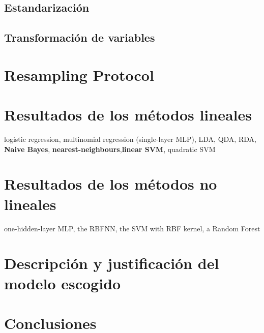 \documentclass[a4paper]{article}
\begin{document}
\subsection{Estandarización}

\subsection{Transformación de variables}

\section{Resampling Protocol}

\section{Resultados de los métodos lineales}
logistic regression, multinomial regression
(single-layer MLP), LDA, QDA, RDA, \textbf{Naive Bayes}, \textbf{nearest-neighbours},\textbf{linear SVM}, quadratic SVM
\section{Resultados de los métodos no lineales}
one-hidden-layer MLP, the RBFNN, the SVM with RBF kernel, a
Random Forest
\section{Descripción y justificación del modelo escogido}

\section{Conclusiones}
\end{document}
